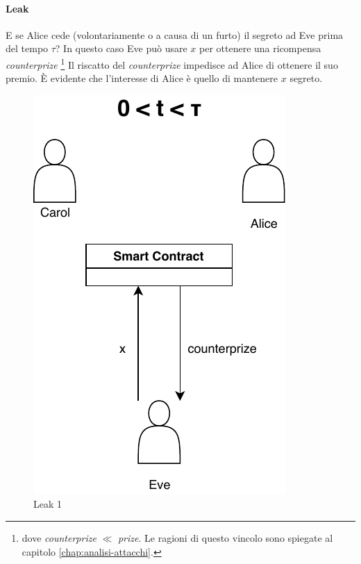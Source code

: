 \paragraph{Leak}
E se Alice cede (volontariamente o a causa di un furto)
il segreto ad Eve prima del tempo $ \tau $?
In questo caso Eve può usare $ x $ per ottenere una ricompensa
\textit{counterprize} \footnote{dove \textit{counterprize} $ \ll $ \textit{prize}.
	Le ragioni di questo vincolo sono spiegate al capitolo \ref{chap:analisi-attacchi}.}
Il riscatto del \textit{counterprize} impedisce ad Alice di ottenere il suo premio.
È evidente che l'interesse di Alice è quello di mantenere $ x $ segreto.
\begin{figure}[H]
	\begin{minipage}{0.4\textwidth}
		\centering
		\includegraphics[width=.7\linewidth]{images/chap_protocollo/base-leak-1.pdf}
		\caption{Leak 1}
	\end{minipage}\hfill
	\begin{minipage}{0.4\textwidth}
		\centering

\end{minipage}
\end{figure}
